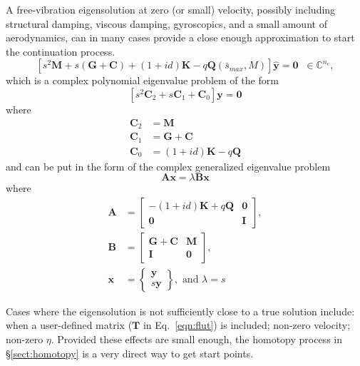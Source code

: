 \documentclass[10pt,openany,twoside]{book}
\numberwithin{equation}{section}   %
\newcommand{\Matrix}[1]{\boldsymbol{#1}}
\newcommand{\Vector}[1]{\boldsymbol{#1}}
\newcommand{\Sectref}[1]{\S\ref{#1}}
\newcommand{\Eqn}[1]{Eq.\ \ref{#1}}
\begin{document}
A free-vibration eigensolution at zero (or small) velocity, possibly
including structural damping, viscous damping, gyroscopics, and a
small amount of aerodynamics, can in many cases provide a close enough
approximation to start the continuation process.
\begin{equation*}
\left[ s^2 \Matrix{M} + s \left(\Matrix{G} + \Matrix{C}\right) +
 (1 + id) \Matrix{K} - q \Matrix{Q} (\bar{s}_{max},M) \right]
  \hat{\Vector{y}} = \Vector{0} \; \; \in \mathbb{C}^{n_e},
\end{equation*}
which is a complex polynomial eigenvalue problem of the form
\begin{equation}
\left[ s^2 \Matrix{C}_2 + s \Matrix{C}_1 +
	\Matrix{C}_0 \right] \Vector{y} = \Vector{0}		\nonumber
\end{equation}
where
\begin{align}
\Matrix{C}_2 &= \Matrix{M} \nonumber \\
\Matrix{C}_1 &= \Matrix{G} + \Matrix{C} \nonumber \\
\Matrix{C}_0 &= (1 + id)\Matrix{K} - q\Matrix{Q}
\end{align}
and can be put in the form of the complex generalized eigenvalue problem
\begin{equation}
\Matrix{A}\Vector{x} = \lambda \Matrix{B}\Vector{x} \nonumber
\end{equation}
where
\begin{align}
\Matrix{A} &= \left[ \begin{array}{cc}
			-(1+id)\Matrix{K} + q\Matrix{Q}  & \Matrix{0} \nonumber \\
	   \Matrix{0}  & \Matrix{I}
		\end{array} \right], \\
\Matrix{B} &= \left[ \begin{array}{cc}
			\Matrix{G} + \Matrix{C}  & \Matrix{M} \nonumber \\
	   \Matrix{I}  & \Matrix{0}
		\end{array} \right], \\
\Vector{x} &= \left\{ \begin{array}{c}
			\Vector{y} \\
	   	s\Vector{y}
		\end{array} \right\}, \text{ and } \lambda = s
\end{align}
\par
Cases where the eigensolution is not sufficiently close to a true solution
include: when a user-defined matrix ($\Matrix{T}$ in \Eqn{eqn:flut}) is
included; non-zero velocity; non-zero $\eta$.
Provided these effects are small enough, the homotopy process in
\Sectref{sect:homotopy} is a very direct way to get start points.
\end{document}
